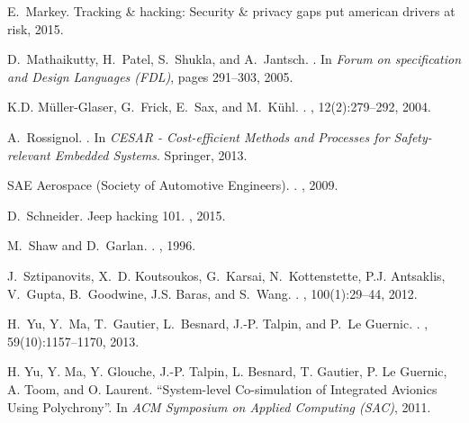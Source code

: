 \begin{thebibliography}{10}
E.~Markey.
\newblock Tracking \& hacking: Security \& privacy gaps put american drivers at
  risk, 2015.

D.~Mathaikutty, H.~Patel, S.~Shukla, and A.~Jantsch.
.
\newblock In {\em Forum on specification and Design Languages (FDL)}, pages
  291--303, 2005.

K.D. M\"uller-Glaser, G.~Frick, E.~Sax, and M.~K\"uhl.
.
,
  12(2):279--292, 2004.

A.~Rossignol.
.
\newblock In {\em CESAR - Cost-efficient Methods and Processes for
  Safety-relevant Embedded Systems}. Springer, 2013.

{SAE Aerospace (Society of Automotive Engineers)}.
.
, 2009.

D.~Schneider.
\newblock Jeep hacking 101.
, 2015.

M.~Shaw and D.~Garlan.
.
, 1996.

J.~Sztipanovits, X.~D. Koutsoukos, G.~Karsai, N.~Kottenstette, P.J. Antsaklis,
  V.~Gupta, B.~Goodwine, J.S. Baras, and S.~Wang.
.
, 100(1):29--44, 2012.

H.~Yu, Y.~Ma, T.~Gautier, L.~Besnard, J.-P. Talpin, and P.~{Le Guernic}.
.
, 59(10):1157--1170, 2013.

{H.} {Y}u, {Y.} {M}a, {Y.} {G}louche, {J.}-{P.} {T}alpin, {L.} {B}esnard, {T.}
  {G}autier, {P.} {L}e {G}uernic, {A.} {T}oom, and {O.} {L}aurent.
\newblock ``{S}ystem-level {C}o-simulation of {I}ntegrated {A}vionics {U}sing {P}olychrony''.
\newblock In {\em ACM Symposium on Applied Computing (SAC)}, 2011.

\end{thebibliography}

